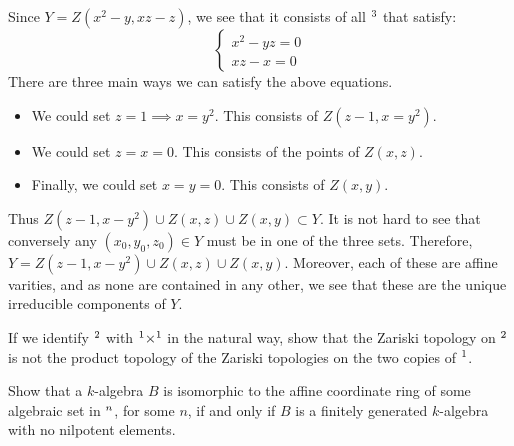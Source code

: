 \documentclass{/Users/SHER/Documents/Hartshorne-Exercises/hw_pset} %
\let\aa\relax
\DeclareMathOperator{\aa}{\mathbf{A}} %
\begin{document}
\begin{solution}
    Since $Y = Z(x^2 - y, xz - z)$,  we see that it consists of all $\aa^3$ that 
    satisfy:
    \[
        \begin{cases}
            x^2 - yz = 0\\
            xz - x = 0
        \end{cases}
    \]
    There are three main ways we can satisfy the above equations. 
    \begin{itemize}
        \item We could set $z = 1 \implies x = y^2$. This consists of $Z(z - 1, x = y^2)$.
        \item We could set $z = x = 0$. This consists of the points of $Z(x, z)$.
        \item Finally, we could set $x = y = 0$. This consists of $Z(x,y)$. 
    \end{itemize}
    Thus $Z(z - 1, x - y^2) \cup Z(x, z) \cup Z(x, y) \subset Y$. It is not 
    hard to see that conversely any $(x_0, y_0, z_0) \in Y$ must be in 
    one of the three sets. Therefore, $Y = Z(z - 1, x - y^2) \cup Z(x, z) \cup Z(x, y)$. 
    Moreover, each of these are affine varities, and as none are contained in any 
    other, we see that these are the unique irreducible components of $Y$.

\end{solution}

\begin{exercise}[1.4]
    If we identify $\aa^2$ with $\aa^1 \times \aa^1$ in the natural way, show
    that the Zariski topology on $\aa^2$ is not the product topology of the
    Zariski topologies on the two copies of $\aa^1$.
\end{exercise}

\begin{solution}

\end{solution}

\begin{exercise}[1.5]
    Show that a $k$-algebra $B$ is isomorphic to the affine coordinate ring of
    some algebraic set in $\aa^n$, for some $n$, if and only if $B$ is a
    finitely generated $k$-algebra with no nilpotent elements.
\end{exercise}
\end{document}
